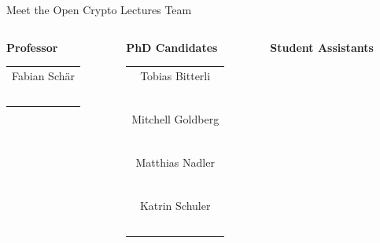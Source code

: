 \documentclass[handout]{beamer}
\begin{document}
\begin{frame}{Meet the Open Crypto Lectures Team}
	\begin{columns}[T]
		\begin{column}{0.31\textwidth}
			\center \textbf{Professor}
			\begin{table}\small
				\begin{tabular}{c}
					Fabian Schär\\
					\href{https://linkedin.com/in/fabian-schaer/}{\faLinkedinSquare}\ \href{https://twitter.com/chainomics}{\faTwitterSquare}\\
				\end{tabular}
			\end{table}
		\end{column}
		\begin{column}{0.31\textwidth}
			\center \textbf{PhD Candidates}
			\begin{table}\small
				\begin{tabular}{c}
					Tobias Bitterli\\
					\href{https://linkedin.com/in/tobiasbitterli/}{\faLinkedinSquare}\ \href{https://twitter.com/tobias_bitterli}{\faTwitterSquare}\\
					\vspace{0.5em}\\
					Mitchell Goldberg\\
					\href{https://linkedin.com/in/mitchell-goldberg/}{\faLinkedinSquare}\ \href{https://twitter.com/golmit_crypto}{\faTwitterSquare}\\
					\vspace{0.5em}\\
					Matthias Nadler\\
					\href{https://linkedin.com/in/mat-nadler/}{\faLinkedinSquare}\ \href{https://twitter.com/mat_nadler}{\faTwitterSquare}\\
					\vspace{0.5em}\\
					Katrin Schuler\\
					\href{https://linkedin.com/in/kmschuler/}{\faLinkedinSquare}\ \href{https://twitter.com/Katatcrypt}{\faTwitterSquare}\\
				\end{tabular}
			\end{table}
		\end{column}
		\begin{column}{0.31\textwidth}
			\center \textbf{Student Assistants}
			\begin{table}\small
				\begin{tabular}{c}

\end{tabular}
\end{table}
\end{column}
\end{columns}
\end{frame}
\end{document}
